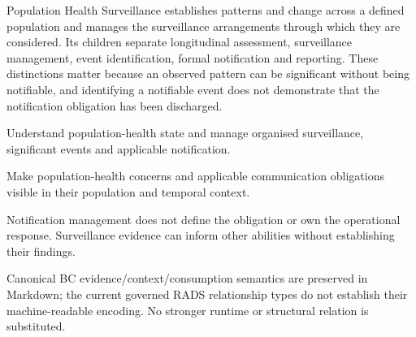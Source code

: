 Population Health Surveillance establishes patterns and change across a defined population and manages the surveillance arrangements through which they are considered. Its children separate longitudinal assessment, surveillance management, event identification, formal notification and reporting. These distinctions matter because an observed pattern can be significant without being notifiable, and identifying a notifiable event does not demonstrate that the notification obligation has been discharged.



Understand population-health state and manage organised surveillance, significant events and applicable notification.



Make population-health concerns and applicable communication obligations visible in their population and temporal context.



Notification management does not define the obligation or own the operational response. Surveillance evidence can inform other abilities without establishing their findings.



Canonical BC evidence/\allowbreak{}context/\allowbreak{}consumption semantics are preserved in Markdown; the current governed RADS relationship types do not establish their machine-readable encoding. No stronger runtime or structural relation is substituted.


